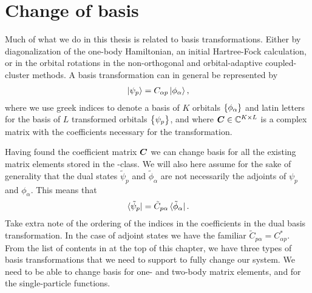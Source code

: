     \section{Change of basis}
        \label{sec:change-of-basis}
        Much of what we do in this thesis is related to basis transformations.
        Either by diagonalization of the one-body Hamiltonian, an initial
        Hartree-Fock calculation, or in the orbital rotations in the
        non-orthogonal and orbital-adaptive coupled-cluster methods.
        A basis transformation can in general be represented by
        \begin{align}
            \ket*{\psi_p} = C_{\alpha p} \ket*{\phi_{\alpha}},
            \label{eq:spf-basis-change}
        \end{align}
        where we use greek indices to denote a basis of $K$ orbitals
        $\left\{ \phi_{\alpha} \right\}$ and latin letters for the basis of $L$
        transformed orbitals $\left\{ \psi_p \right\}$, and where $\boldsymbol{C} \in
        \mathbb{C}^{K\times L}$ is a complex matrix with the coefficients
        necessary for the transformation.

        Having found the coefficient matrix $\boldsymbol{C}$ we can change basis for
        all the existing matrix elements stored in the
        -class.
        We will also here assume for the sake of generality that the dual states
        $\tilde{\psi}_p$ and $\tilde{\phi}_{\alpha}$ are not necessarily the
        adjoints of $\psi_p$ and $\phi_{\alpha}$.
        This means that
        \begin{align}
            \bra*{\tilde{\psi}_p}
            = \tilde{C}_{p \alpha}\bra*{\tilde{\phi}_{\alpha}}.
            \label{eq:spf-dual-basis-change}
        \end{align}
        Take extra note of the ordering of the indices in the coefficients in
        the dual basis transformation.
        In the case of adjoint states we have the familiar $\tilde{C}_{p \alpha}
        = C^{*}_{\alpha p}$.
        From the list of contents in  at the top of this
        chapter, we have three types of basis transformations that we need to
        support to fully change our system.
        We need to be able to change basis for one- and two-body matrix
        elements, and for the single-particle functions.

